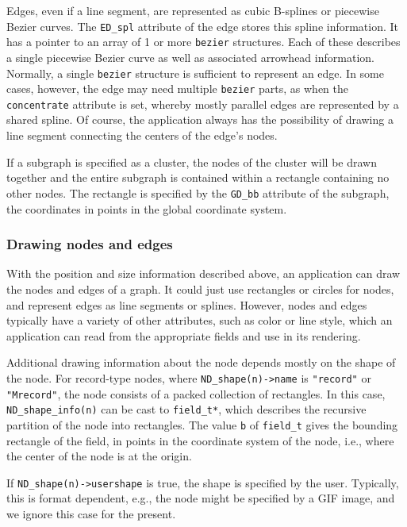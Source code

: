 Edges, even if a line segment, are represented as cubic B-splines or
piecewise Bezier curves.
The {\tt ED\_spl} attribute of the edge stores this spline information.
It has a pointer to an array of 1 or more {\tt bezier} structures. Each
of these describes a single piecewise Bezier curve as well as associated
arrowhead information. Normally, a single {\tt bezier} structure is
sufficient to represent an edge. In some cases, however, 
the edge may need multiple {\tt bezier} parts, as when the {\tt concentrate}
attribute is set, whereby mostly parallel edges are represented by a
shared spline.
Of course, the application always has the possibility of drawing a line
segment connecting the centers of the edge's nodes.

If a subgraph is specified as a cluster, the nodes of the cluster
will be drawn together and the entire subgraph is contained within
a rectangle containing no other nodes. The rectangle is specified by
the {\tt GD\_bb} attribute of the subgraph, the coordinates in points in
the global coordinate system.

\subsubsection{Drawing nodes and edges}
\label{sec:nodes}

With the position and size information described above, an application 
can draw the nodes and edges of a graph. It could just use rectangles 
or circles for nodes, and represent edges as line segments or splines.
However, nodes and edges typically have a variety of other attributes,
such as color or line style, which an application can read from the
appropriate fields and use in its rendering.

Additional drawing information about the node depends mostly on the shape
of the node. 
For record-type nodes, where \verb+ND_shape(n)->name+ is {\tt "record"} or 
{\tt "Mrecord"}, the node consists of a packed collection
of rectangles. In this case, \verb+ND_shape_info(n)+ can be cast to
\verb+field_t*+, which describes the recursive partition of the node
into rectangles. The value {\tt b} of \verb+field_t+
gives the bounding rectangle of the field, in points in the coordinate
system of the node, i.e., where the center of the node is at the
origin. 

If \verb+ND_shape(n)->usershape+ is true, the shape
is specified by the user. Typically, this is format dependent, e.g.,
the node might be specified by a GIF image, and we ignore this case
for the present. 


